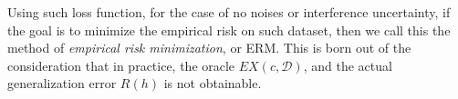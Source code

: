 \documentclass[10pt,oneside,oldfontcommands,dvipsnames,article]{memoir}
\begin{document}
Using such loss function, for the case of no noises or interference uncertainty, if the goal is to minimize the empirical risk on such dataset, then we call this the method of \textit{empirical risk minimization}, or ERM. This is born out of the consideration that in practice, the oracle $EX(c,\mathcal{D})$, and the actual generalization error $R(h)$ is not obtainable. 
\clearpage

{
\small


}
\end{document}
